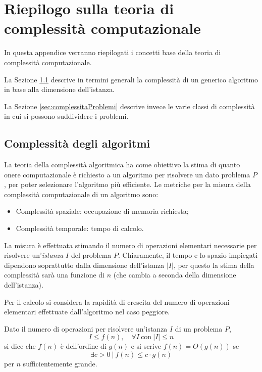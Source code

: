 \appendix
{}
\chapter[Riepilogo complessità computazionale]{Riepilogo sulla teoria di complessità 
computazionale}
\label{chap:appA}
In questa appendice verranno riepilogati i concetti base della teoria di complessità 
computazionale.

La Sezione \ref{sec:complessitaAlgoritmi} descrive in termini generali la 
complessità di un generico algoritmo in base alla dimensione dell'istanza.

La Sezione \ref{sec:complessitaProblemi} descrive invece le varie classi di complessità 
in cui si possono suddividere i problemi.

\section{Complessità degli algoritmi}
\label{sec:complessitaAlgoritmi}
La teoria della complessità algoritmica ha come obiettivo la stima di quanto onere 
computazionale è richiesto a un algoritmo per risolvere un dato problema $P$, per poter 
selezionare l'algoritmo più efficiente. Le metriche per la misura della complessità 
computazionale di un algoritmo sono:
\begin{itemize}
 \item Complessità spaziale: occupazione di memoria richiesta;
 \item Complessità temporale: tempo di calcolo.
\end{itemize}
La misura è effettuata stimando il numero di operazioni elementari necessarie per 
risolvere un'\emph{istanza} $I$ del problema $P$. Chiaramente, il tempo e lo spazio 
impiegati dipendono soprattutto dalla dimensione dell'istanza $\vert I \vert$, per questo 
la stima della complessità sarà una funzione di $n$ (che cambia a seconda della 
dimensione dell'istanza).

Per il calcolo si considera la rapidità di crescita del numero di operazioni elementari 
effettuate dall'algoritmo nel caso peggiore.
\begin{mydef}
\label{def:definizioneComplessita}
Dato il numero di operazioni per 
risolvere un'istanza $I$ di un problema $P$,
\begin{displaymath}
 I \leq f(n), \quad \forall I\  \text{con}\  \vert I \vert \leq n
\end{displaymath}
si dice che $f(n)$ è dell'ordine di $g(n)$ e si scrive $f(n) = O(g(n))$ se
\begin{equation}
 \exists c > 0\  \vert\  f(n) \leq c\cdot g(n)
\end{equation}
per $n$ sufficientemente grande.
\end{mydef}

